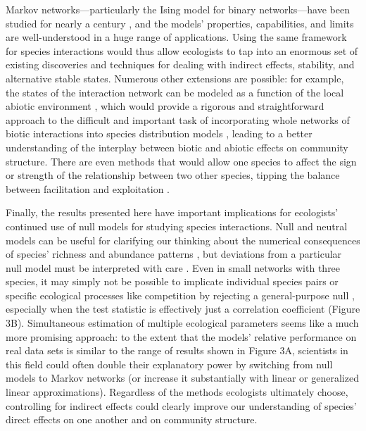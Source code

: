 Markov networks---particularly the Ising model for binary
networks---have been studied for nearly a century
\citep{cipra_introduction_1987}, and the models' properties,
capabilities, and limits are well-understood in a huge range of
applications. Using the same framework for species interactions would
thus allow ecologists to tap into an enormous set of existing
discoveries and techniques for dealing with indirect effects, stability,
and alternative stable states. Numerous other extensions are possible:
for example, the states of the interaction network can be modeled as a
function of the local abiotic environment \citep{lee_learning_2012},
which would provide a rigorous and straightforward approach to the
difficult and important task of incorporating whole networks of biotic
interactions into species distribution models
\citep{kissling_towards_2012, pollock_understanding_2014}, leading to a
better understanding of the interplay between biotic and abiotic effects
on community structure. There are even methods
\citep{whittam_species_1981, tjelmeland_markov_1998} that would allow
one species to affect the sign or strength of the relationship between
two other species, tipping the balance between facilitation and
exploitation \citep{bruno_inclusion_2003}.

Finally, the results presented here have important implications for
ecologists' continued use of null models for studying species
interactions. Null and neutral models can be useful for clarifying our
thinking about the numerical consequences of species' richness and
abundance patterns \citep{harris_occupancy_2011, xiao_strong_2015}, but
deviations from a particular null model must be interpreted with care
\citep{roughgarden_competition_1983}. Even in small networks with three
species, it may simply not be possible to implicate individual species
pairs or specific ecological processes like competition by rejecting a
general-purpose null \citep{gotelli_empirical_2009}, especially when the
test statistic is effectively just a correlation coefficient (Figure
3B). Simultaneous estimation of multiple ecological parameters seems
like a much more promising approach: to the extent that the models'
relative performance on real data sets is similar to the range of
results shown in Figure 3A, scientists in this field could often double
their explanatory power by switching from null models to Markov networks
(or increase it substantially with linear or generalized linear
approximations). Regardless of the methods ecologists ultimately choose,
controlling for indirect effects could clearly improve our understanding
of species' direct effects on one another and on community structure.

